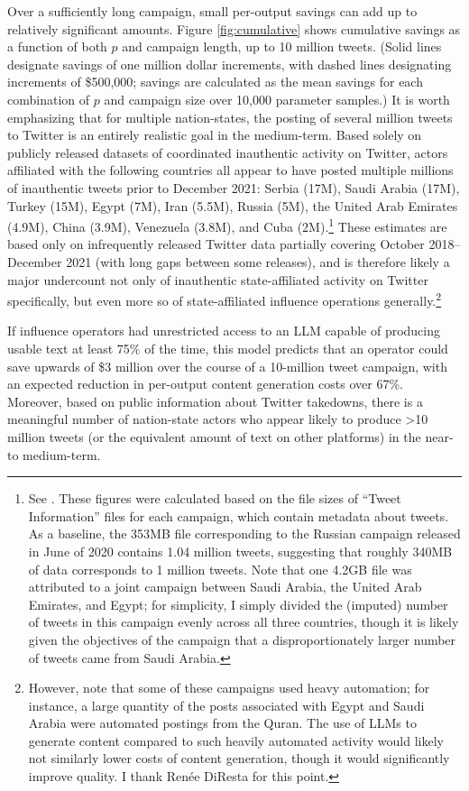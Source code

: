 \documentclass{article}
\begin{document}
Over a sufficiently long campaign, small per-output savings can add up to relatively significant amounts. Figure \ref{fig:cumulative} shows cumulative savings as a function of both $p$ and campaign length, up to 10 million tweets. (Solid lines designate savings of one million dollar increments, with dashed lines designating increments of \$500,000; savings are calculated as the mean savings for each combination of $p$ and campaign size over 10,000 parameter samples.) It is worth emphasizing that for multiple nation-states, the posting of several million tweets to Twitter is an entirely realistic goal in the medium-term. Based solely on publicly released datasets of coordinated inauthentic activity on Twitter, actors affiliated with the following countries all appear to have posted multiple millions of inauthentic tweets prior to December 2021: Serbia (17M), Saudi Arabia (17M), Turkey (15M), Egypt (7M), Iran (5.5M), Russia (5M), the United Arab Emirates (4.9M), China (3.9M), Venezuela (3.8M), and Cuba (2M).\footnote{See \cite{twitterops}. These figures were calculated based on the file sizes of ``Tweet Information'' files for each campaign, which contain metadata about tweets. As a baseline, the 353MB file corresponding to the Russian campaign released in June of 2020 contains 1.04 million tweets, suggesting that roughly 340MB of data corresponds to 1 million tweets. Note that one 4.2GB file was attributed to a joint campaign between Saudi Arabia, the United Arab Emirates, and Egypt; for simplicity, I simply divided the (imputed) number of tweets in this campaign evenly across all three countries, though it is likely given the objectives of the campaign that a disproportionately larger number of tweets came from Saudi Arabia.} These estimates are based only on infrequently released Twitter data partially covering October 2018–December 2021 (with long gaps between some releases), and is therefore likely a major undercount not only of inauthentic state-affiliated activity on Twitter specifically, but even more so of state-affiliated influence operations generally.\footnote{However, note that some of these campaigns used heavy automation; for instance, a large quantity of the posts associated with Egypt and Saudi Arabia were automated postings from the Quran. The use of LLMs to generate content compared to such heavily automated activity would likely not similarly lower costs of content generation, though it would significantly improve quality. I thank Renée DiResta for this point.}

If influence operators had unrestricted access to an LLM capable of producing usable text at least 75\% of the time, this model predicts that an operator could save upwards of \$3 million over the course of a 10-million tweet campaign, with an expected reduction in per-output content generation costs over 67\%. Moreover, based on public information about Twitter takedowns, there is a meaningful number of nation-state actors who appear likely to produce >10 million tweets (or the equivalent amount of text on other platforms) in the near- to medium-term.
\end{document}
